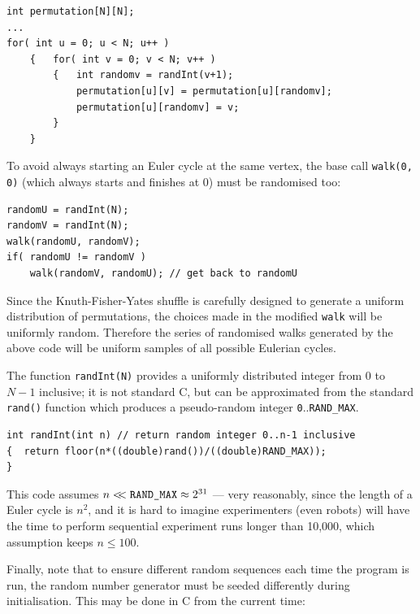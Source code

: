 \documentclass[12pt]{article}
\begin{document}
\begin{verbatim}
int permutation[N][N];
...
for( int u = 0; u < N; u++ )
    {   for( int v = 0; v < N; v++ )
        {   int randomv = randInt(v+1);
            permutation[u][v] = permutation[u][randomv];
            permutation[u][randomv] = v;
        }
    }
\end{verbatim}

To avoid always starting an Euler cycle at the same vertex, the base call \texttt{walk(0, 0)} (which always starts and finishes at 0) must be randomised too:

\begin{verbatim}
randomU = randInt(N);
randomV = randInt(N);
walk(randomU, randomV);
if( randomU != randomV )
    walk(randomV, randomU); // get back to randomU
\end{verbatim}

Since the Knuth-Fisher-Yates shuffle is carefully designed to generate a uniform distribution of permutations, the choices made in the modified \texttt{walk} will be uniformly random. Therefore the series of randomised walks generated by the above code will be uniform samples of all possible Eulerian cycles.

The function \texttt{randInt(N)} provides a uniformly distributed integer from $0$ to $N-1$ inclusive; it is not standard C, but can be approximated from the standard \texttt{rand()} function which produces a pseudo-random integer \texttt{0}..\texttt{RAND\_MAX}. 

\begin{verbatim}
int randInt(int n) // return random integer 0..n-1 inclusive
{  return floor(n*((double)rand())/((double)RAND_MAX));
}
\end{verbatim}

This code assumes $n<\!\!<\mbox{\tt RAND\_MAX}\approx 2^{31}$ \cite[p119]{knuth2} --- very reasonably, since the length of a Euler cycle is $n^2$, and it is hard to imagine experimenters (even robots) will have the time to perform sequential experiment runs longer than 10,000, which assumption keeps $n\leq100$. 

Finally, note that to ensure different random sequences each time the program is run, the random number generator must be seeded differently during initialisation. This may be done in C from the current time:
\end{document}
